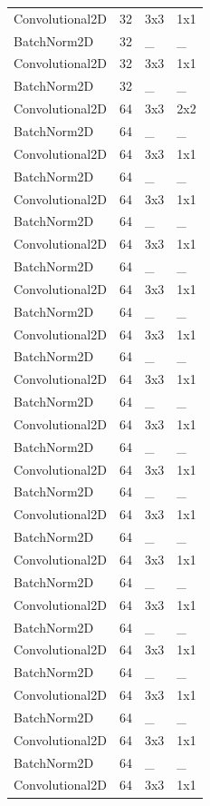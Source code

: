 \begin{center}
\begin{longtable}{|l|l|l|l|}
		Convolutional2D & 32 & 3x3 & 1x1 \\
		BatchNorm2D & 32 & \_ & \_ \\
		Convolutional2D & 32 & 3x3 & 1x1 \\
		BatchNorm2D & 32 & \_ & \_ \\
		Convolutional2D & 64 & 3x3 & 2x2 \\
		BatchNorm2D & 64 & \_ & \_ \\
		Convolutional2D & 64 & 3x3 & 1x1 \\
		BatchNorm2D & 64 & \_ & \_ \\
		Convolutional2D & 64 & 3x3 & 1x1 \\
		BatchNorm2D & 64 & \_ & \_ \\
		Convolutional2D & 64 & 3x3 & 1x1 \\
		BatchNorm2D & 64 & \_ & \_ \\
		Convolutional2D & 64 & 3x3 & 1x1 \\
		BatchNorm2D & 64 & \_ & \_ \\
		Convolutional2D & 64 & 3x3 & 1x1 \\
		BatchNorm2D & 64 & \_ & \_ \\
		Convolutional2D & 64 & 3x3 & 1x1 \\
		BatchNorm2D & 64 & \_ & \_ \\
		Convolutional2D & 64 & 3x3 & 1x1 \\
		BatchNorm2D & 64 & \_ & \_ \\
		Convolutional2D & 64 & 3x3 & 1x1 \\
		BatchNorm2D & 64 & \_ & \_ \\
		Convolutional2D & 64 & 3x3 & 1x1 \\
		BatchNorm2D & 64 & \_ & \_ \\
		Convolutional2D & 64 & 3x3 & 1x1 \\
		BatchNorm2D & 64 & \_ & \_ \\
		Convolutional2D & 64 & 3x3 & 1x1 \\
		BatchNorm2D & 64 & \_ & \_ \\
		Convolutional2D & 64 & 3x3 & 1x1 \\
		BatchNorm2D & 64 & \_ & \_ \\
		Convolutional2D & 64 & 3x3 & 1x1 \\
		BatchNorm2D & 64 & \_ & \_ \\
		Convolutional2D & 64 & 3x3 & 1x1 \\
		BatchNorm2D & 64 & \_ & \_ \\
		Convolutional2D & 64 & 3x3 & 1x1 \\

\end{longtable}
\end{center}
